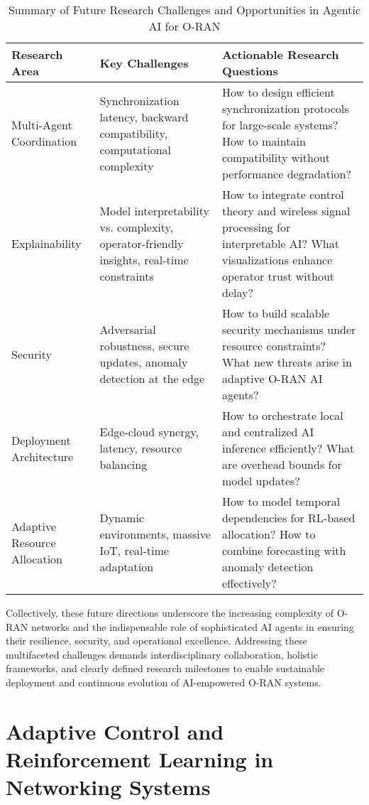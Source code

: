 \documentclass[sigconf]{acmart}
\begin{document}
\begin{table*}[htbp]
\centering
\caption{Summary of Future Research Challenges and Opportunities in Agentic AI for O-RAN}
\label{tab:future_challenges}
\begin{adjustbox}{max width=\textwidth}
\begin{tabular}{@{}lll@{}}
\toprule
\textbf{Research Area} & \textbf{Key Challenges} & \textbf{Actionable Research Questions} \\
\midrule
Multi-Agent Coordination & Synchronization latency, backward compatibility, computational complexity & How to design efficient synchronization protocols for large-scale systems? How to maintain compatibility without performance degradation? \\
Explainability & Model interpretability vs. complexity, operator-friendly insights, real-time constraints & How to integrate control theory and wireless signal processing for interpretable AI? What visualizations enhance operator trust without delay? \\
Security & Adversarial robustness, secure updates, anomaly detection at the edge & How to build scalable security mechanisms under resource constraints? What new threats arise in adaptive O-RAN AI agents? \\
Deployment Architecture & Edge-cloud synergy, latency, resource balancing & How to orchestrate local and centralized AI inference efficiently? What are overhead bounds for model updates? \\
Adaptive Resource Allocation & Dynamic environments, massive IoT, real-time adaptation & How to model temporal dependencies for RL-based allocation? How to combine forecasting with anomaly detection effectively? \\
\bottomrule
\end{tabular}
\end{adjustbox}
\end{table*}

Collectively, these future directions underscore the increasing complexity of O-RAN networks and the indispensable role of sophisticated AI agents in ensuring their resilience, security, and operational excellence. Addressing these multifaceted challenges demands interdisciplinary collaboration, holistic frameworks, and clearly defined research milestones to enable sustainable deployment and continuous evolution of AI-empowered O-RAN systems.

\section{Adaptive Control and Reinforcement Learning in Networking Systems}
\end{document}
